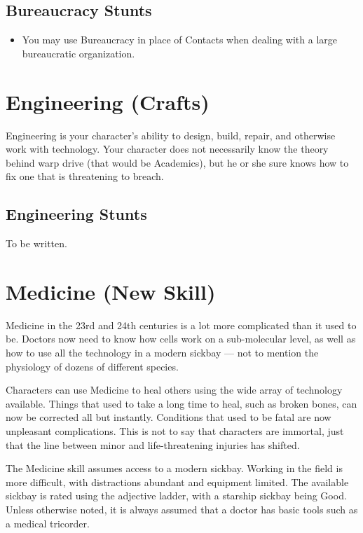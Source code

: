 \documentclass[12pt,titlepage,openany]{book}
\begin{document}
\subsection*{Bureaucracy Stunts}\label{subsec:bureaucracy-stunts}

\begin{itemize}
    \item {} You may use Bureaucracy in place of Contacts
        when dealing with a large bureaucratic organization.
\end{itemize}

\section{Engineering (Crafts)}\label{sec:engineering}

Engineering is your character's ability to design, build, repair, and otherwise
work with technology. Your character does not necessarily know the theory
behind warp drive (that would be Academics), but he or she sure knows how to
fix one that is threatening to breach.

\subsection*{Engineering Stunts}\label{subsec:engineering-stunts}

To be written.

\section{Medicine (New Skill)}\label{sec:medicine}

Medicine in the 23rd and 24th centuries is a lot more complicated than it used
to be. Doctors now need to know how cells work on a sub-molecular level, as
well as how to use all the technology in a modern sickbay --- not to mention
the physiology of dozens of different species.

Characters can use Medicine to heal others using the wide array of technology
available. Things that used to take a long time to heal, such as broken bones,
can now be corrected all but instantly. Conditions that used to be fatal are
now unpleasant complications. This is not to say that characters are immortal,
just that the line between minor and life-threatening injuries has shifted.

The Medicine skill assumes access to a modern sickbay. Working in the field is
more difficult, with distractions abundant and equipment limited. The available
sickbay is rated using the adjective ladder, with a starship sickbay being
Good. Unless otherwise noted, it is always assumed that a doctor has basic
tools such as a medical tricorder.
\end{document}
